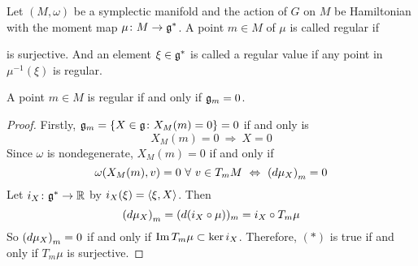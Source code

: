 \documentclass[a4paper,12pt]{article}
\begin{document}
	Let $(M,\omega)$ be a symplectic manifold and the action of $G$ on $M$ be Hamiltonian with the moment map $\mu \colon M \rightarrow \mathfrak{g}^*$. A point $m \in M$ of $\mu$ is called regular if
	\begin{center}
	\end{center}
	is surjective. And an element $\xi \in \mathfrak{g}^*$ is called a regular value if any point in $\mu^{-1}(\xi)$ is regular.
	\begin{prop}
		A point $m \in M$ is regular if and only if $\mathfrak{g}_m = 0$.
	\end{prop}
	\begin{proof}
		Firstly, $\mathfrak{g}_m = \left\{X \in \mathfrak{g} \colon X_M(m) = 0\right\} = 0$ if and only is
		\begin{equation*}
			X_M(m) = 0 ~\Rightarrow~ X=0 \tag{$*$}
		\end{equation*}
		Since $\omega$ is nondegenerate, $X_M(m) = 0$ if and only if
		\begin{equation*}
			\omega(X_M(m),v) = 0~\forall~v \in T_mM ~\Leftrightarrow~ \left(d\mu_X\right)_m = 0
		\end{equation*}
		Let $i_X \colon \mathfrak{g}^* \rightarrow \mathbb{R}$ by $i_X(\xi) = \left\langle \xi,X \right\rangle$. Then
		\begin{equation*}
			\left(d\mu_X\right)_m = (d(i_X\circ \mu))_m = i_X  \circ T_m\mu
		\end{equation*}
		So $\left(d\mu_X\right)_m = 0$ if and only if $\operatorname{Im} T_m\mu \subset \ker i_X$. Therefore, $(*)$ is true if and only if $T_m\mu$ is surjective.
	\end{proof}
\end{document}
